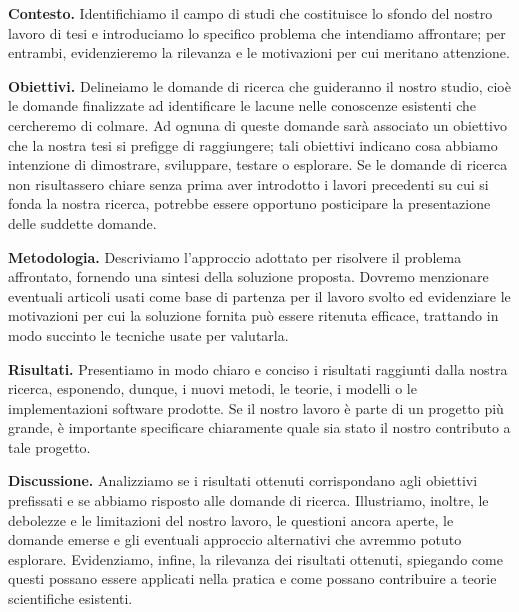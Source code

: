 
\textbf{Contesto.} Identifichiamo il campo di studi che costituisce lo sfondo del nostro lavoro di tesi e introduciamo lo specifico problema che intendiamo affrontare; per entrambi, evidenzieremo la rilevanza e le motivazioni per cui meritano attenzione.

\medskip

\textbf{Obiettivi.} Delineiamo le domande di ricerca che guideranno il nostro studio, cioè le domande finalizzate ad identificare le lacune nelle conoscenze esistenti che cercheremo di colmare. Ad ognuna di queste domande sarà associato un obiettivo che la nostra tesi si prefigge di raggiungere; tali obiettivi indicano cosa abbiamo intenzione di dimostrare, sviluppare, testare o esplorare. Se le domande di ricerca non risultassero chiare senza prima aver introdotto i lavori precedenti su cui si fonda la nostra ricerca, potrebbe essere opportuno posticipare la presentazione delle suddette domande.

\medskip

\textbf{Metodologia.} Descriviamo l'approccio adottato per risolvere il problema affrontato, fornendo una sintesi della soluzione proposta. Dovremo menzionare eventuali articoli usati come base di partenza per il lavoro svolto ed evidenziare le motivazioni per cui la soluzione fornita può essere ritenuta efficace, trattando in modo succinto le tecniche usate per valutarla.

\medskip

\textbf{Risultati.} Presentiamo in modo chiaro e conciso i risultati raggiunti dalla nostra ricerca, esponendo, dunque, i nuovi metodi, le teorie, i modelli o le implementazioni software prodotte. Se il nostro lavoro è parte di un progetto più grande, è importante specificare chiaramente quale sia stato il nostro contributo a tale progetto.

\medskip

\textbf{Discussione.} Analizziamo se i risultati ottenuti corrispondano agli obiettivi prefissati e se abbiamo risposto alle domande di ricerca. Illustriamo, inoltre, le debolezze e le limitazioni del nostro lavoro, le questioni ancora aperte, le domande emerse e gli eventuali approccio alternativi che avremmo potuto esplorare. Evidenziamo, infine, la rilevanza dei risultati ottenuti, spiegando come questi possano essere applicati nella pratica e come possano contribuire a teorie scientifiche esistenti.

